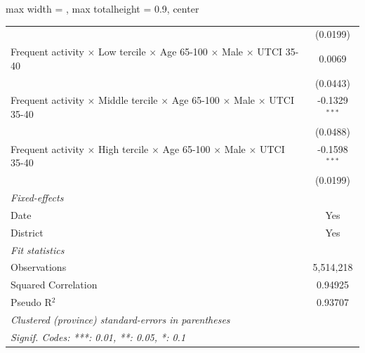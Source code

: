 \begin{table}[htbp]
\begin{adjustbox}{max width = \textwidth, max totalheight = 0.9\textheight, center}
\begin{tabular}{lc}
                                                                                                               & (0.0199)\\   
         Frequent activity $\times$ Low tercile $\times$ Age 65-100 $\times$ Male $\times$ UTCI 35-40          & 0.0069\\   
                                                                                                               & (0.0443)\\   
         Frequent activity $\times$ Middle tercile $\times$ Age 65-100 $\times$ Male $\times$ UTCI 35-40       & -0.1329$^{***}$\\   
                                                                                                               & (0.0488)\\   
         Frequent activity $\times$ High tercile $\times$ Age 65-100 $\times$ Male $\times$ UTCI 35-40         & -0.1598$^{***}$\\   
                                                                                                               & (0.0199)\\   
         \midrule
         \emph{Fixed-effects}\\
         Date                                                                                                  & Yes\\  
         District                                                                                              & Yes\\  
         \midrule
         \emph{Fit statistics}\\
         Observations                                                                                          & 5,514,218\\  
         Squared Correlation                                                                                   & 0.94925\\  
         Pseudo R$^2$                                                                                          & 0.93707\\  
         \midrule \midrule
         \multicolumn{2}{l}{\emph{Clustered (province) standard-errors in parentheses}}\\
         \multicolumn{2}{l}{\emph{Signif. Codes: ***: 0.01, **: 0.05, *: 0.1}}\\
      \end{tabular}
   \end{adjustbox}
\end{table}



